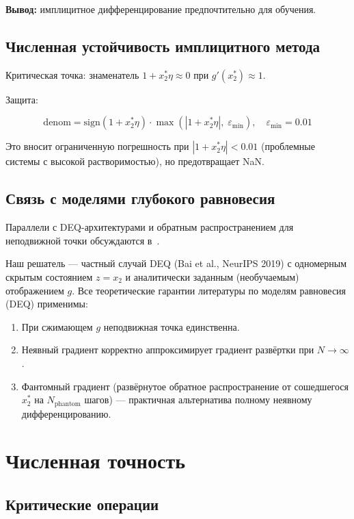 \documentclass[11pt]{article}
\begin{document}
\textbf{Вывод:} имплицитное дифференцирование предпочтительно для обучения.

\subsection{Численная устойчивость имплицитного метода}

Критическая точка: знаменатель $1 + x_2^{*}\eta \approx 0$ при $g'(x_2^{*}) \approx 1$.

Защита:

\begin{equation*}
\mathrm{denom} = \mathrm{sign}(1 + x_2^{*}\eta) \cdot \max\!\left(|1 + x_2^{*}\eta|,\; \varepsilon_{\min}\right), \quad \varepsilon_{\min} = 0.01
\end{equation*}

Это вносит ограниченную погрешность при $|1 + x_2^{*}\eta| < 0.01$ (проблемные системы с высокой растворимостью), но предотвращает NaN.

\subsection{Связь с моделями глубокого равновесия}

Параллели с DEQ-архитектурами и обратным распространением для неподвижной точки обсуждаются в~\cite{bai2019}.

Наш решатель --- частный случай DEQ (Bai et al., NeurIPS 2019) с одномерным скрытым состоянием $z = x_2$ и аналитически заданным (необучаемым) отображением $g$. Все теоретические гарантии литературы по моделям равновесия (DEQ) применимы:

\begin{enumerate}
  \item При сжимающем $g$ неподвижная точка единственна.
  \item Неявный градиент корректно аппроксимирует градиент развёртки при $N \to \infty$.
  \item Фантомный градиент (развёрнутое обратное распространение от сошедшегося $x_2^{*}$ на $N_{\mathrm{phantom}}$ шагов) --- практичная альтернатива полному неявному дифференцированию.
\end{enumerate}

\section{Численная точность}

\subsection{Критические операции}
\end{document}
